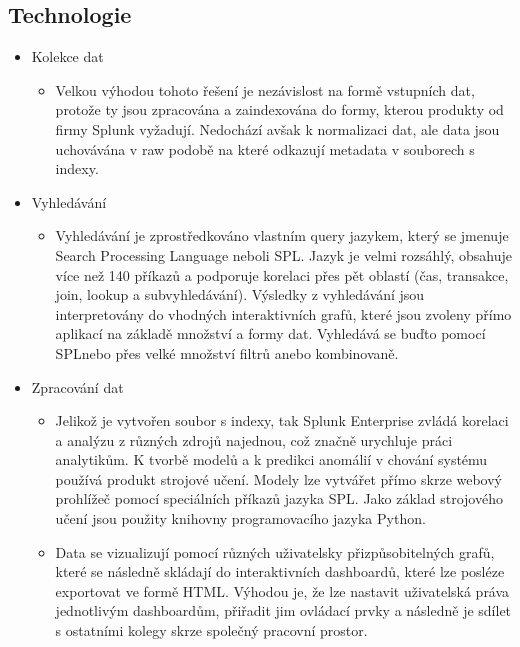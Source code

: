 \documentclass[czech,BP]{thesiskiv2}
\begin{document}
\subsection{Technologie}
\begin{itemize}
	\item Kolekce dat
		\begin{itemize}
			\item Velkou výhodou tohoto řešení je nezávislost na formě vstupních dat, protože ty jsou zpracována a zaindexována do formy, kterou produkty od firmy Splunk vyžadují. Nedochází avšak k normalizaci dat, ale data jsou uchovávána v raw podobě na které odkazují metadata v souborech s indexy. 
		\end{itemize}
	\item Vyhledávání
		\begin{itemize}
			\item Vyhledávání je zprostředkováno vlastním query jazykem, který se jmenuje Search Processing Language neboli SPL\texttrademark. Jazyk je velmi rozsáhlý, obsahuje více než 140 příkazů a podporuje korelaci přes pět oblastí (čas, transakce, join, lookup a subvyhledávání). Výsledky z vyhledávání jsou interpretovány do vhodných interaktivních grafů, které jsou zvoleny přímo aplikací na základě množství a formy dat. Vyhledává se buďto pomocí SPL\texttrademark nebo přes velké množství filtrů anebo kombinovaně. \cite{Operational_intelligence}
		\end{itemize}
	\item Zpracování dat
		\begin{itemize}
			\item Jelikož je vytvořen soubor s indexy, tak Splunk Enterprise zvládá korelaci a analýzu z různých zdrojů najednou, což značně urychluje práci analytikům. K tvorbě modelů a k predikci anomálií v chování systému používá produkt strojové učení. Modely lze vytvářet přímo skrze webový prohlížeč pomocí speciálních příkazů jazyka SPL\texttrademark. Jako základ strojového učení jsou použity knihovny programovacího jazyka Python. \cite{MachineLearning}
			
			\item Data se vizualizují pomocí různých uživatelsky přizpůsobitelných grafů, které se následně skládají do interaktivních dashboardů, které lze posléze exportovat ve formě HTML. Výhodou je, že lze nastavit uživatelská práva jednotlivým dashboardům, přiřadit jim ovládací prvky a následně je sdílet s ostatními kolegy skrze společný pracovní prostor.
		\end{itemize}
\end{itemize}
\end{document}
